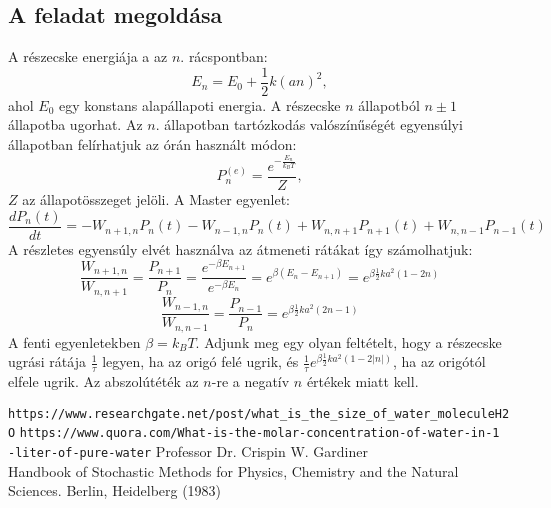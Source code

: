 \documentclass[12pt]{article}
\begin{document}
\subsection*{A feladat megoldása}
A részecske energiája a az $n.$ rácspontban:
$$E_n = E_0+\frac{1}{2}k(an)^2,$$
ahol $E_0$ egy konstans alapállapoti energia. A részecske $n$ állapotból $n\pm 1$ állapotba ugorhat. Az $n.$ állapotban tartózkodás valószínűségét egyensúlyi állapotban felírhatjuk az órán használt módon:
$$P^{(e)}_n = \frac{e^{-\frac{E_n}{k_B T}}}{Z},$$
$Z$ az állapotösszeget jelöli.  A Master egyenlet:
$$\frac{dP_n(t)}{dt }= -W_{n+1,n}P_n(t)-W_{n-1,n}P_{n}(t) + W_{n, n+1}P_{n+1}(t)+W_{n, n-1}P_{n-1}(t)$$
A részletes egyensúly elvét  használva az átmeneti rátákat így számolhatjuk:
$$\frac{W_{n+1, n}}{W_{n, n+1}} = \frac{P_{n+1}}{P_n} = \frac{e^{-\beta E_{n+1}}}{e^{-\beta E_n}} = e^{\beta (E_n-E_{n+1})} = e^{\beta\frac{1}{2}ka^2(1-2n)}$$
$$\frac{W_{n-1,n}}{W_{n, n-1}} = \frac{P_{n-1}}{P_n} = e^{\beta \frac{1}{2}ka^2(2n-1)}$$
A fenti egyenletekben $\beta = k_B T$. Adjunk meg egy olyan feltételt, hogy a részecske ugrási rátája $\frac{1}{\tau}$ legyen, ha az origó felé ugrik, és $\frac{1}{\tau}e^{\beta\frac{1}{2}ka^2(1-2|n|)}$, ha az origótól elfele ugrik. Az abszolútéték az $n$-re a negatív $n$ értékek miatt kell.
 





\begin{thebibliography}{9}

\texttt{https://www.researchgate.net/post/what\_{}is\_{}the\_{}size\_{}of\_{}water\_{}moleculeH2O}
\texttt{https://www.quora.com/What-is-the-molar-concentration-of-water-in-1\\-liter-of-pure-water}
 Professor Dr. Crispin W. Gardiner \\Handbook of Stochastic Methods for Physics, Chemistry and the Natural Sciences. Berlin, Heidelberg (1983)


\end{thebibliography}
\end{document}
